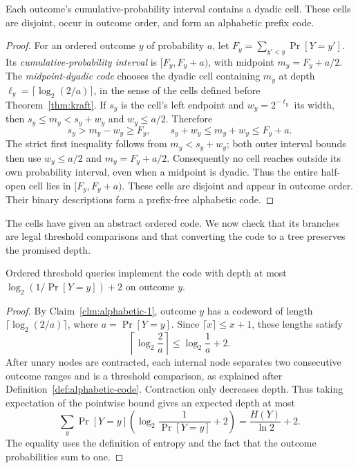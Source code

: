 \begin{claim}
\label{clm:alphabetic-1}
Each outcome's cumulative-probability interval contains a dyadic
cell. These cells are disjoint, occur in outcome order, and form
an alphabetic prefix code.
\end{claim}
\begin{proof}
For an ordered outcome $y$ of probability $a$, let
$F_y=\sum_{y'<y}\Pr[Y=y']$. Its \emph{cumulative-probability
interval} is $[F_y,F_y+a)$, with midpoint $m_y=F_y+a/2$.
The \emph{midpoint-dyadic code} chooses the dyadic cell containing
$m_y$ at depth $\ell_y=\lceil\log_2(2/a)\rceil$, in the sense
of the cells defined before Theorem~\ref{thm:kraft}.
If $s_y$ is the cell's left endpoint and $w_y=2^{-\ell_y}$ its
width, then $s_y\le m_y<s_y+w_y$ and $w_y\le a/2$. Therefore
\[
 s_y>m_y-w_y\ge F_y,\qquad
 s_y+w_y\le m_y+w_y\le F_y+a.
\]
The strict first inequality follows from $m_y<s_y+w_y$;
both outer interval bounds then use $w_y\le a/2$ and
$m_y=F_y+a/2$. Consequently no cell reaches outside its own
probability interval, even when a midpoint is dyadic.
Thus the entire half-open cell lies in $[F_y,F_y+a)$.
These cells are disjoint and appear in
outcome order. Their binary descriptions form a prefix-free
alphabetic code. 
\end{proof}

The cells have given an abstract ordered code. We now check that its
branches are legal threshold comparisons and that converting the code
to a tree preserves the promised depth.

\begin{claim}
\label{clm:alphabetic-2}
Ordered threshold queries implement the code with depth at most $\log_2(1/\Pr[Y=y])+2$ on outcome $y$.
\end{claim}
\begin{proof}
By Claim~\ref{clm:alphabetic-1}, outcome $y$ has a codeword of
length $\lceil\log_2(2/a)\rceil$, where $a=\Pr[Y=y]$.
Since $\lceil x\rceil\le x+1$, these lengths
satisfy
\[
 \left\lceil\log_2\frac2a\right\rceil
 \le\log_2\frac1a+2.
\]
After unary nodes are contracted, each internal node separates
two consecutive outcome ranges and is a threshold comparison,
as explained after Definition~\ref{def:alphabetic-code}.
Contraction only decreases depth. Thus taking expectation of the
pointwise bound gives an expected depth at most
\[
 \sum_y\Pr[Y=y]\left(\log_2\frac1{\Pr[Y=y]}+2\right)
 =\frac{H(Y)}{\ln2}+2.
\]
The equality uses the definition of entropy and the fact that the
outcome probabilities sum to one.
\end{proof}

